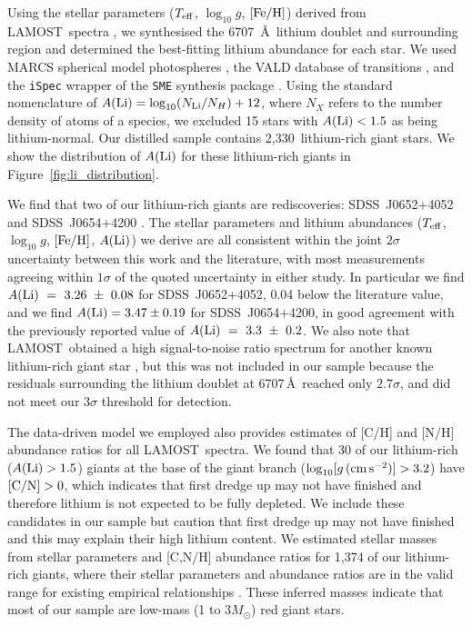 \documentclass[twocolumn]{aastex62}
\newcommand{\SampleSize}{2,330}
\newcommand\lamost{LAMOST}
\newcommand{\logg}{\log_{10}[g\,({\rm cm\,s}^{-2})]}
\begin{document}

Using the stellar parameters ($T_{\rm eff}$, $\log_{10}{g}$, $[{\rm Fe/H}]$)
derived from \lamost\ spectra \citep{Ho_2017a}, we synthesised the 6707~\AA\ lithium 
doublet and surrounding region and determined the best-fitting lithium abundance for 
each star. We used MARCS spherical model photospheres \citep{Gustafsson_2008}, the
VALD database of transitions \citep{Piskunov_1995}, and the \texttt{iSpec} 
\citep{Blanco_Cuaresma_2014} wrapper of the \texttt{SME} synthesis package \citep{Valenti_1996}.
Using the standard nomenclature of 
$A({\rm Li}) = \log_{10}(N_{\rm Li}/N_{H}) + 12$, where $N_X$ refers to the
number density of atoms of a species, we excluded 15 stars with $A({\rm Li}) < 1.5$
as being lithium-normal. Our distilled sample contains \SampleSize\ 
lithium-rich giant stars. We show the distribution of $A({\rm Li})$ for these 
lithium-rich giants in Figure~\ref{fig:li_distribution}.

We find that two of our lithium-rich giants are rediscoveries:
SDSS~J0652+4052 and SDSS~J0654+4200 \citep{Martell_2013}. The stellar parameters and lithium 
abundances ($T_{\rm eff}$, $\log_{10}g$, $[{\rm Fe/H}]$, $A({\rm Li})$) we 
derive are all consistent within the joint $2\sigma$ uncertainty between this
work and the literature, with most measurements agreeing within $1\sigma$ of 
the quoted uncertainty in either study. In particular we find 
$A({\rm Li})~=~3.26~\pm~0.08$ for SDSS~J0652+4052, 0.04 below 
the literature value, and we find $A({\rm Li}) = 3.47 \pm 0.19$ for 
SDSS~J0654+4200, in good agreement with the previously reported 
value of $A({\rm Li})~=~3.3~\pm~0.2$. We also note that \lamost\ obtained a high signal-to-noise
ratio spectrum for another known lithium-rich giant star \citep[SDSS~J0304+3823;][]{Martell_2013}, 
but this was not included in our sample because the residuals surrounding the
lithium doublet at 6707\,\AA\ reached only $2.7\sigma$, and did not meet our $3\sigma$
threshold for detection.


The data-driven model we employed also provides estimates of [C/H] and [N/H] abundance
ratios for all \lamost\ spectra. We found that 30 of our lithium-rich 
($A({\rm Li}) > 1.5$) giants at the base of the giant branch 
($\logg > 3.2$) have $[{\rm C/N}] > 0$, which indicates that first dredge up may not have finished and therefore lithium is not expected to be fully depleted.
We include these candidates in our sample but caution that first 
dredge up may not have finished and this may explain their high
lithium content. We estimated stellar masses from stellar parameters and 
[C,N/H] abundance ratios for 1,374 of our lithium-rich giants, where their 
stellar parameters and abundance ratios are in the valid range for existing 
empirical relationships \citep{Martig_2016}. These inferred masses indicate 
that most of our sample are low-mass (1 to 3$M_\odot$) red giant stars.
\end{document}
